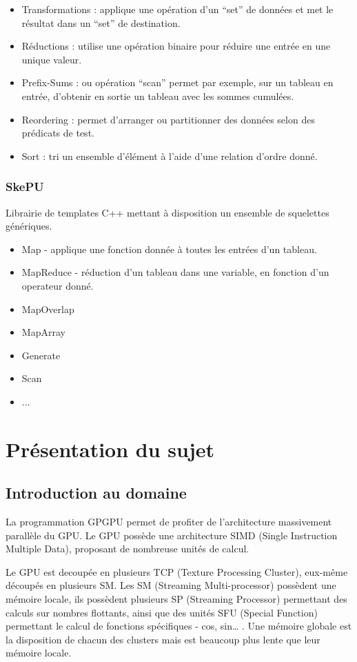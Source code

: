 \documentclass{report}
\begin{document}
\begin{itemize}
\item Transformations : applique une opération d’un “set” de données et met le résultat dans un “set” de destination. 
\item Réductions : utilise une opération binaire pour réduire une entrée en une unique valeur. 
\item Prefix-Sums : ou opération “scan” permet par exemple, sur un tableau en entrée, d’obtenir en sortie un tableau avec les sommes cumulées.
\item Reordering : permet d’arranger ou partitionner des données selon des prédicats de test.
\item Sort : tri un ensemble d’élément à l’aide d’une relation d’ordre donné.
\end{itemize}

\subsection{SkePU}
Librairie de templates C++ mettant à disposition un ensemble de squelettes génériques.

\begin{itemize}
\item Map\cite{refMap} - applique une fonction donnée à toutes les entrées d’un tableau.
\item MapReduce - réduction d’un tableau dans une variable, en fonction d’un operateur donné.
\item MapOverlap
\item MapArray
\item Generate
\item Scan
\item ...
\end{itemize}

\chapter{Présentation du sujet}

\section{Introduction au domaine}
La programmation GPGPU permet de profiter de l’architecture massivement parallèle du GPU. Le GPU possède une architecture SIMD (Single Instruction Multiple Data), proposant de nombreuse unités de calcul.\newline

Le GPU est decoupée en plusieurs TCP (Texture Processing Cluster), eux-même découpés en plusieurs SM. Les SM (Streaming Multi-processor) possèdent une mémoire locale, ils possèdent plusieurs SP (Streaming Processor) permettant des calculs sur nombres flottants, ainsi que des unités SFU (Special Function) permettant le calcul de fonctions spécifiques - cos, sin… . Une mémoire globale est la disposition de chacun des clusters mais est beaucoup plus lente que leur mémoire locale.
\end{document}
